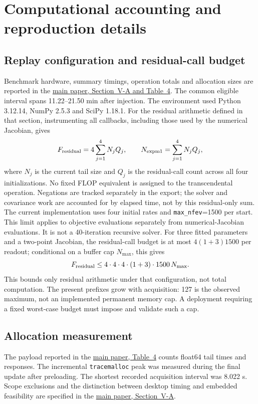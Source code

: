 \documentclass[lettersize,journal]{IEEEtran}
\newcommand{\mainpaper}[1]{\href{SPR_smart_stop_current.pdf}{main paper, #1}}
\begin{document}
\section{Computational accounting and reproduction details}
\subsection{Replay configuration and residual-call budget}
Benchmark hardware, summary timings, operation totals and allocation sizes
are reported in the \mainpaper{Section~V-A and Table~4}.
The common eligible interval spans 11.22--21.50 min after injection.
The environment used Python 3.12.14, NumPy 2.5.3 and SciPy 1.18.1.
For the residual arithmetic defined in that section, instrumenting all
callbacks, including those used by the numerical Jacobian, gives
\begin{equation}
 F_{\rm residual}=4\sum_{j=1}^{4}N_jQ_j,\qquad
 N_{\rm expm1}=\sum_{j=1}^{4}N_jQ_j,
\end{equation}
where $N_j$ is the current tail size and $Q_j$ is the residual-call count
across all four initializations. No fixed FLOP equivalent is assigned to
the transcendental operation. Negations are tracked separately in the
export; the solver and covariance work are accounted for by elapsed time,
not by this residual-only sum.
The current implementation uses four initial rates and
\texttt{max\_nfev}=1500 per start. This limit applies to objective
evaluations separately from numerical-Jacobian evaluations.
It is not a 40-iteration recursive solver. For three fitted parameters and
a two-point Jacobian, the residual-call budget is at most
$4(1+3)1500$ per readout; conditional on a buffer cap $N_{\max}$, this gives
\begin{equation}
 F_{\rm residual}\leq
 4\cdot4\cdot4\cdot(1+3)\cdot1500\,N_{\max}.
\end{equation}
This bounds only residual arithmetic under that configuration, not total
computation. The present prefixes grow with acquisition: 127 is the
observed maximum, not an implemented permanent memory cap. A deployment
requiring a fixed worst-case budget must impose and validate such a cap.


\subsection{Allocation measurement}
The payload reported in the \mainpaper{Table~4} counts float64 tail times
and responses. The incremental \texttt{tracemalloc} peak was measured
during the final update after preloading. The shortest recorded acquisition
interval was 8.022 s. Scope exclusions and the distinction between desktop
timing and embedded feasibility are specified in the
\mainpaper{Section~V-A}.
\end{document}

